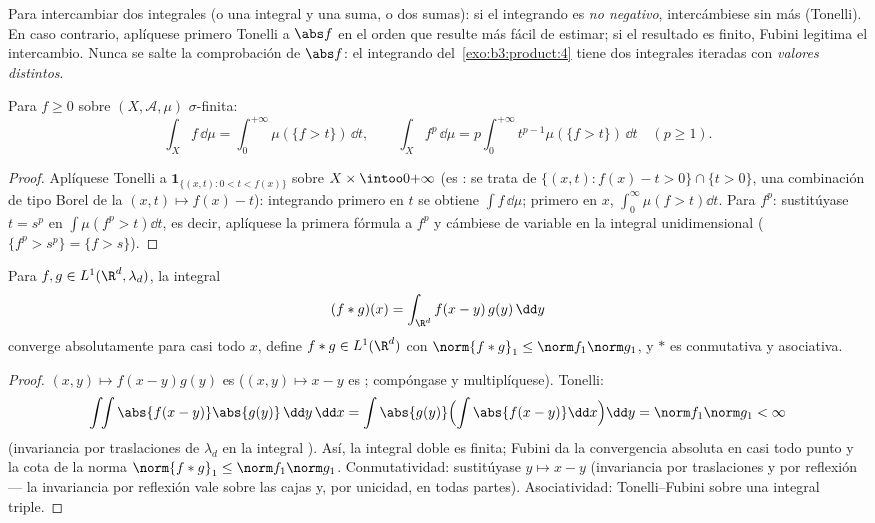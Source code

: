 \begin{method}\label{met:b3:product:fubini}
Para intercambiar dos integrales (o una integral y una suma, o dos
sumas): si el integrando es \emph{no negativo}, intercámbiese sin más
(Tonelli). En caso contrario, aplíquese primero Tonelli a $\abs f$ en el
orden que resulte más fácil de estimar; si el resultado es finito,
Fubini legitima el intercambio. Nunca se salte la comprobación de
$\abs f$: el integrando del~\cref{exo:b3:product:4} tiene dos integrales
iteradas con \emph{valores distintos}.
\end{method}

\begin{proposition}\label{prop:b3:product:layercake}
Para $f \geq 0$  sobre
$(X, \mathcal A, \mu)$ $\sigma$-finita:
\[
\int_X f\,\dd\mu = \int_0^{+\infty}\mu(\{f > t\})\,\dd t,
\qquad
\int_X f^p\,\dd\mu = p\int_0^{+\infty}t^{p-1}\mu(\{f >
t\})\,\dd t \quad (p \geq 1).
\]
\end{proposition}

\begin{proof}
Aplíquese Tonelli a $\mathbf 1_{\{(x,t) : 0 < t < f(x)\}}$ sobre $X
\times \intoo0{+\infty}$ (es
: se trata de
$\{(x,t): f(x) - t
> 0\}\cap\{t > 0\}$, una combinación de tipo Borel de la
 $(x,t)\mapsto f(x) - t$):
integrando primero en $t$ se obtiene $\int f\,\dd\mu$; primero en $x$,
$\int_0^\infty\mu(f >
t)\dd t$. Para $f^p$: sustitúyase $t = s^p$ en $\int\mu(f^p > t)
\dd t$, es decir, aplíquese la primera fórmula a $f^p$ y cámbiese de
variable en la integral unidimensional ($\{f^p > s^p\} =
\{f > s\}$).
\end{proof}

\begin{theorem}[Convolución en $L^1$]\label{thm:b3:product:convolution}
Para $f, g \in L^1(\R^d, \lambda_d)$, la integral
\[
(f * g)(x) = \int_{\R^d} f(x - y)\,g(y)\,\dd y
\]
converge absolutamente para casi todo $x$, define $f * g \in
L^1(\R^d)$ con $\norm{f*g}_1 \leq \norm f_1\norm g_1$, y $*$ es
conmutativa y asociativa.
\end{theorem}

\begin{proof}
$(x, y) \mapsto f(x-y)g(y)$ es
 ($ (x,y)\mapsto x -
y$ es ; compóngase y
multiplíquese). Tonelli:
\[
\int\!\!\int \abs{f(x-y)}\abs{g(y)}\,\dd y\,\dd x
= \int\abs{g(y)}\Bigl(\int\abs{f(x - y)}\dd x\Bigr)\dd y
= \norm f_1\norm g_1 < \infty
\]
(invariancia por traslaciones de $\lambda_d$ en la integral ).
Así, la integral doble es finita; Fubini da la convergencia absoluta en
casi todo punto y la cota de la norma $\norm{f*g}_1 \leq \norm
f_1\norm g_1$. Conmutatividad: sustitúyase $y \mapsto x - y$
(invariancia por traslaciones y por reflexión --- la invariancia por
reflexión vale sobre las cajas y, por unicidad, en todas partes).
Asociatividad: Tonelli--Fubini sobre una integral triple.
\end{proof}

